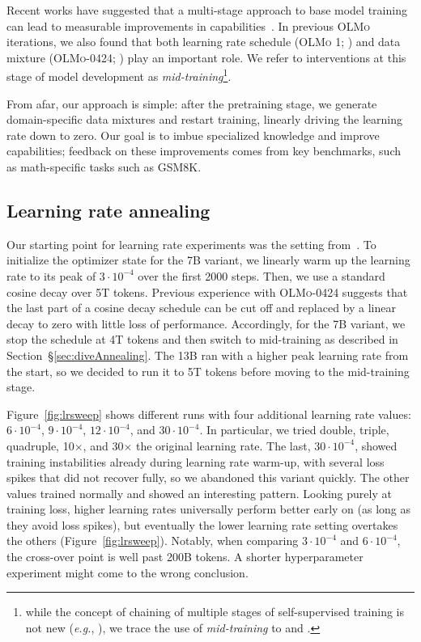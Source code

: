 \documentclass[table]{ai2style/ai2}
\newcommand{\olmo}{\textsc{OLMo}\xspace}
\newcommand{\olmozero}{\textsc{OLMo 1}\xspace}
\newcommand{\olmoapril}{\textsc{OLMo-0424}\xspace}
\begin{document}
Recent works have suggested that a multi-stage approach to base model training can lead to measurable improvements in capabilities~\citep{blakeney2024doesdatasparkjoy,ibrahim2024simplescalablestrategiescontinually,feng2024maximize}.
In previous \olmo iterations, we also found that both   learning rate schedule (\olmozero; \citealt{Groeneveld2024OLMoAT}) and data mixture (\olmoapril; \citealt{olmo_blog}) play an important role.
We refer to interventions at this stage of model development as \textit{mid-training}\footnote{while the concept of chaining of multiple stages of self-supervised training is not new (\textit{e.g.}, \citealt{gururangan2020dontStopPretraining}), we trace the use of \textit{mid-training} to \citet{abdin2024phi} and \citet{openai2024midtraining}.}.

From afar, our approach is simple: after the pretraining stage, we generate domain-specific data mixtures and restart training, linearly driving the learning rate down to zero. 
Our goal is to imbue specialized knowledge and improve capabilities; feedback on these improvements comes from key benchmarks, such as math-specific tasks such as GSM8K. 

\subsection{Learning rate annealing}
\label{sec:learning_rate_deep_dive}

Our starting point for learning rate experiments was the setting from~\citet{dubey2024llama}.
To initialize the optimizer state for the 7B variant, we linearly warm up the learning rate to its peak of $3 \cdot 10^{-4}$ over the first 2000 steps.
Then, we use a standard cosine decay over 5T tokens.
Previous experience with \olmoapril suggests that the last part of a cosine decay schedule can be cut off and replaced by a linear decay to zero with little loss of performance.
Accordingly, for the 7B variant, we stop the schedule at 4T tokens and then switch to mid-training as described in Section~\S\ref{sec:diveAnnealing}.
The 13B ran with a higher peak learning rate from the start, so we decided to run it to 5T tokens before moving to the mid-training stage.

Figure~\ref{fig:lrsweep} shows different runs with four additional learning rate values: $6 \cdot 10^{-4}$, $9 \cdot 10^{-4}$, $12 \cdot 10^{-4}$, and $30 \cdot 10^{-4}$.
In particular, we tried double, triple, quadruple, 10$\times$, and 30$\times$ the original learning rate.
The last, $30 \cdot 10^{-4}$, showed training instabilities already during learning rate warm-up, with several loss spikes that did not recover fully, so we abandoned this variant quickly.
The other values trained normally and showed an interesting pattern.
Looking purely at training loss, higher learning rates universally perform better early on (as long as they avoid loss spikes), but eventually the lower learning rate setting overtakes the others (Figure~\ref{fig:lrsweep}).
Notably, when comparing $3 \cdot 10^{-4}$ and $6 \cdot 10^{-4}$, the cross-over point is well past 200B tokens.
A shorter hyperparameter experiment might come to the wrong conclusion.
\end{document}
